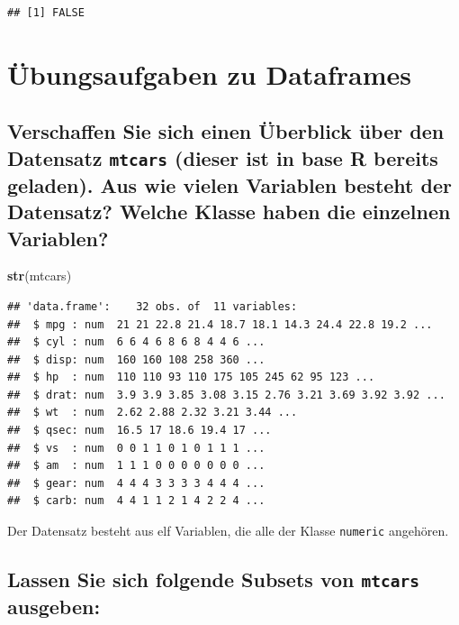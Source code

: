 \documentclass[12pt,a4paper]{article}
\newenvironment{Shaded}{\begin{snugshade}}{\end{snugshade}}
\newcommand{\FunctionTok}[1]{\textcolor[rgb]{0.13,0.29,0.53}{\textbf{#1}}}
\newcommand{\NormalTok}[1]{#1}
\begin{document}
\begin{verbatim}
## [1] FALSE
\end{verbatim}

\section{Übungsaufgaben zu
Dataframes}\label{uxfcbungsaufgaben-zu-dataframes}

\subsection{\texorpdfstring{Verschaffen Sie sich einen Überblick über
den Datensatz \texttt{mtcars} (dieser ist in base R bereits geladen).
Aus wie vielen Variablen besteht der Datensatz? Welche Klasse haben die
einzelnen
Variablen?}{Verschaffen Sie sich einen Überblick über den Datensatz mtcars (dieser ist in base R bereits geladen). Aus wie vielen Variablen besteht der Datensatz? Welche Klasse haben die einzelnen Variablen?}}\label{verschaffen-sie-sich-einen-uxfcberblick-uxfcber-den-datensatz-mtcars-dieser-ist-in-base-r-bereits-geladen.-aus-wie-vielen-variablen-besteht-der-datensatz-welche-klasse-haben-die-einzelnen-variablen}

\begin{Shaded}
\begin{Highlighting}[]
    \FunctionTok{str}\NormalTok{(mtcars)}
\end{Highlighting}
\end{Shaded}

\begin{verbatim}
## 'data.frame':    32 obs. of  11 variables:
##  $ mpg : num  21 21 22.8 21.4 18.7 18.1 14.3 24.4 22.8 19.2 ...
##  $ cyl : num  6 6 4 6 8 6 8 4 4 6 ...
##  $ disp: num  160 160 108 258 360 ...
##  $ hp  : num  110 110 93 110 175 105 245 62 95 123 ...
##  $ drat: num  3.9 3.9 3.85 3.08 3.15 2.76 3.21 3.69 3.92 3.92 ...
##  $ wt  : num  2.62 2.88 2.32 3.21 3.44 ...
##  $ qsec: num  16.5 17 18.6 19.4 17 ...
##  $ vs  : num  0 0 1 1 0 1 0 1 1 1 ...
##  $ am  : num  1 1 1 0 0 0 0 0 0 0 ...
##  $ gear: num  4 4 4 3 3 3 3 4 4 4 ...
##  $ carb: num  4 4 1 1 2 1 4 2 2 4 ...
\end{verbatim}

Der Datensatz besteht aus elf Variablen, die alle der Klasse
\texttt{numeric} angehören.

\subsection{\texorpdfstring{Lassen Sie sich folgende Subsets von
\texttt{mtcars}
ausgeben:}{Lassen Sie sich folgende Subsets von mtcars ausgeben:}}\label{lassen-sie-sich-folgende-subsets-von-mtcars-ausgeben}
\end{document}
